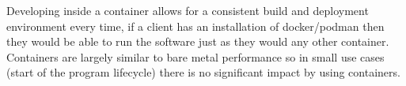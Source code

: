 \documentclass{article}
\begin{document}
Developing inside a container allows for a consistent build and deployment environment 
every time, if a client has an installation of docker/podman then they would be able to 
run the software just as they would any other container. Containers are largely similar 
to bare metal performance so in small use cases (start of the program lifecycle) there 
is no significant impact by using containers.
\end{document}
